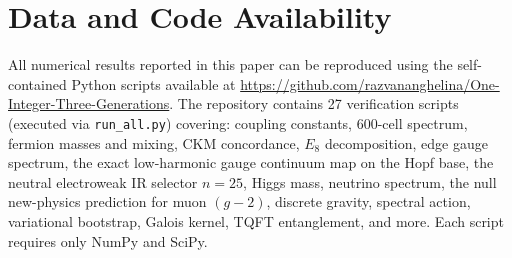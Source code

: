 \documentclass[12pt,a4paper]{article}
\theoremstyle{definition}
\begin{document}
\section*{Data and Code Availability}

All numerical results reported in this paper can be reproduced using the self-contained Python scripts available at \url{https://github.com/razvananghelina/One-Integer-Three-Generations}. The repository contains 27 verification scripts (executed via \texttt{run\_all.py}) covering: coupling constants, 600-cell spectrum, fermion masses and mixing, CKM concordance, $E_8$ decomposition, edge gauge spectrum, the exact low-harmonic gauge continuum map on the Hopf base, the neutral electroweak IR selector $n=25$, Higgs mass, neutrino spectrum, the null new-physics prediction for muon $(g-2)$, discrete gravity, spectral action, variational bootstrap, Galois kernel, TQFT entanglement, and more. Each script requires only NumPy and SciPy.
\end{document}
